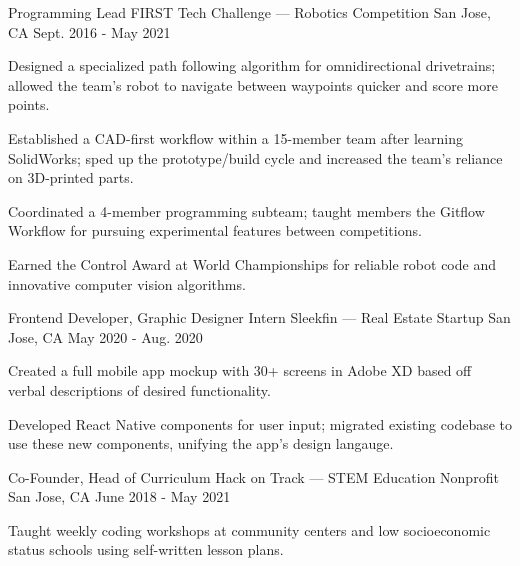 
\begin{cventries}
  \cventry
  {Programming Lead} %
  {FIRST Tech Challenge --- Robotics Competition} %
  {San Jose, CA} %
  {Sept. 2016 - May 2021} %
  {
    \begin{cvitems} %
      \item {Designed a specialized path following algorithm for omnidirectional drivetrains; allowed the team's robot to navigate between waypoints quicker and score more points.}
      \item {Established a CAD-first workflow within a 15-member team after learning SolidWorks; sped up the prototype/build cycle and increased the team's reliance on 3D-printed parts.}
      \item {Coordinated a 4-member programming subteam; taught members the Gitflow Workflow for pursuing experimental features between competitions.}
      \item {Earned the Control Award at World Championships for reliable robot code and innovative computer vision algorithms.}
    \end{cvitems}
  }

  \cventry
  {Frontend Developer, Graphic Designer Intern} %
  {Sleekfin --- Real Estate Startup} %
  {San Jose, CA} %
  {May 2020 - Aug. 2020} %
  {
    \begin{cvitems} %
      \item {Created a full mobile app mockup with 30+ screens in Adobe XD based off verbal descriptions of desired functionality.}
      \item {Developed React Native components for user input; migrated existing codebase to use these new components, unifying the app's design langauge.}
    \end{cvitems}
  }

  \cventry
  {Co-Founder, Head of Curriculum} %
  {Hack on Track --- STEM Education Nonprofit} %
  {San Jose, CA} %
  {June 2018 - May 2021} %
  {
    \begin{cvitems} %
      \item {Taught weekly coding workshops at community centers and low socioeconomic status schools using self-written lesson plans.}
    \end{cvitems}
  }
\end{cventries}
